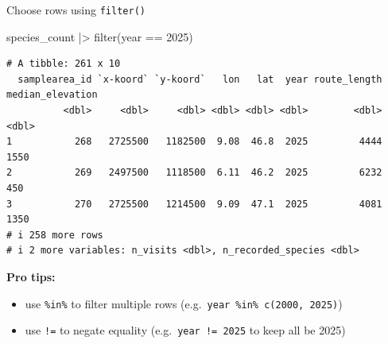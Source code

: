 \documentclass[
  ignorenonframetext,
  aspectratio=169,
]{beamer}
\newenvironment{Shaded}{\begin{snugshade}}{\end{snugshade}}
\newcommand{\DecValTok}[1]{\textcolor[rgb]{0.68,0.00,0.00}{#1}}
\newcommand{\FunctionTok}[1]{\textcolor[rgb]{0.28,0.35,0.67}{#1}}
\newcommand{\NormalTok}[1]{\textcolor[rgb]{0.00,0.23,0.31}{#1}}
\newcommand{\SpecialCharTok}[1]{\textcolor[rgb]{0.37,0.37,0.37}{#1}}
\providecommand{\tightlist}{%
  \setlength{\itemsep}{0pt}\setlength{\parskip}{0pt}}
\let\oldtexttt\texttt
\renewcommand{\texttt}[1]{\colorbox{gray!20}{\oldtexttt{#1}}}
\begin{document}
\begin{frame}[fragile]{Choose rows using \texttt{filter()}}
\protect{}\label{choose-rows-using-filter}
\footnotesize

\begin{Shaded}
\begin{Highlighting}[]
\NormalTok{species\_count }\SpecialCharTok{|\textgreater{}} \FunctionTok{filter}\NormalTok{(year }\SpecialCharTok{==} \DecValTok{2025}\NormalTok{)}
\end{Highlighting}
\end{Shaded}

\begin{verbatim}
# A tibble: 261 x 10
  samplearea_id `x-koord` `y-koord`   lon   lat  year route_length median_elevation
          <dbl>     <dbl>     <dbl> <dbl> <dbl> <dbl>        <dbl>            <dbl>
1           268   2725500   1182500  9.08  46.8  2025         4444             1550
2           269   2497500   1118500  6.11  46.2  2025         6232              450
3           270   2725500   1214500  9.09  47.1  2025         4081             1350
# i 258 more rows
# i 2 more variables: n_visits <dbl>, n_recorded_species <dbl>
\end{verbatim}

\normalsize

\pause

\textbf{Pro tips:}

\begin{itemize}
\tightlist
\item
  use \texttt{\%in\%} to filter multiple rows
  (e.g.~\texttt{year\ \%in\%\ c(2000,\ 2025)})
\item
  use \texttt{!=} to negate equality (e.g.~\texttt{year\ !=\ 2025} to
  keep all be 2025)
\end{itemize}
\end{frame}
\end{document}
